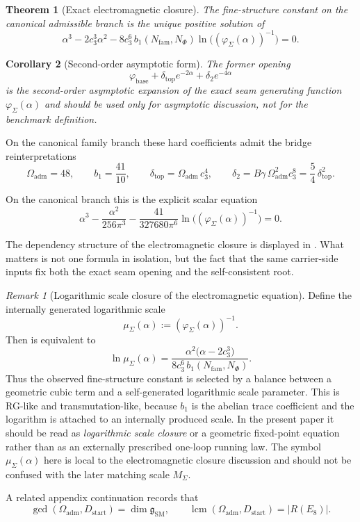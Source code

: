 \documentclass[11pt,a4paper]{article}
\newtheorem{theorem}{Theorem}[section]
\newtheorem{corollary}[theorem]{Corollary}
\theoremstyle{definition}
\theoremstyle{remark}
\newtheorem*{remark}{Remark}
\newcommand{\cthree}{c_3}
\newcommand{\phibase}{\varphi_{\mathrm{base}}}
\newcommand{\phiseam}{\varphi_{\Sigma}}
\newcommand{\deltatop}{\delta_{\mathrm{top}}}
\newcommand{\bone}{b_1}
\newcommand{\SM}{\mathrm{SM}}
\newcommand{\Oadm}{\Omega_{\mathrm{adm}}}
\newcommand{\Dstart}{D_{\mathrm{start}}}
\begin{document}
\begin{theorem}[Exact electromagnetic closure]
\label{thm:exact-electromagnetic-closure}
The fine-structure constant on the canonical admissible branch is the unique positive solution of
\label{eq:carrier-cfe}
\[
\alpha^3
-2\cthree^3\alpha^2
-8\cthree^6\,\bone(N_{\mathrm{fam}},N_\Phi)
\ln\!\bigl((\phiseam(\alpha))^{-1}\bigr)\tag{\theequation}
=0.
\]
\end{theorem}

\begin{corollary}[Second-order asymptotic form]
The former opening
\[
\phibase+\deltatop e^{-2\alpha}+\delta_2e^{-4\alpha}
\]
is the second-order asymptotic expansion of the exact seam generating function
$\phiseam(\alpha)$ and should be used only for asymptotic discussion, not for the benchmark definition.
\end{corollary}

On the canonical family branch these hard coefficients admit the bridge reinterpretations
\[
\Oadm=48,
\qquad
\bone=\frac{41}{10},
\qquad
\deltatop=\Oadm\,\cthree^4,
\qquad
\delta_2=B\gamma\,\Oadm^2\cthree^8=\frac54\,\deltatop^2.
\]

On the canonical branch this is the explicit scalar equation
\[
\alpha^3-\frac{\alpha^2}{256\pi^3}-\frac{41}{327680\pi^6}\ln\!\bigl((\phiseam(\alpha))^{-1}\bigr)=0.
\]

The dependency structure of the electromagnetic closure is displayed in . What matters is not one formula in isolation, but the fact that the same carrier-side inputs fix both the exact seam opening and the self-consistent root.
\begin{remark}[Logarithmic scale closure of the electromagnetic equation]
Define the internally generated logarithmic scale
\[
\mu_\Sigma(\alpha):=(\phiseam(\alpha))^{-1}.
\]
Then  is equivalent to
\[
\ln \mu_\Sigma(\alpha)
=
\frac{\alpha^2\bigl(\alpha-2\cthree^3\bigr)}
{8\cthree^6\,\bone(N_{\mathrm{fam}},N_\Phi)}.
\]
Thus the observed fine-structure constant is selected by a balance between a geometric cubic term
and a self-generated logarithmic scale parameter. This is RG-like and transmutation-like,
because $\bone$ is the abelian trace coefficient and the logarithm is attached to an internally
produced scale. In the present paper it should be read as \emph{logarithmic scale closure} or a
geometric fixed-point equation rather than as an externally prescribed one-loop running law. The
symbol $\mu_\Sigma(\alpha)$ here is local to the electromagnetic closure discussion and should
not be confused with the later matching scale $M_\Sigma$.
\end{remark}
A related appendix continuation records that
\[
\gcd(\Oadm,\Dstart)=\dim \mathfrak g_{\SM},
\qquad
\operatorname{lcm}(\Oadm,\Dstart)=|R(E_8)|.
\]
\end{document}
